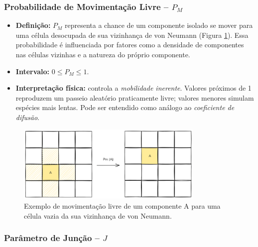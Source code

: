 \documentclass[12pt,oneside]{report}
\begin{document}
\subsubsection{Probabilidade de Movimentação Livre – \texorpdfstring{$P_M$}{Pm}}
\label{subsubsec:Pm}

\begin{itemize}
    \item \textbf{Definição:} $P_M$ representa a chance de um componente isolado se mover para uma célula desocupada de sua vizinhança de von Neumann (Figura \ref{fig:movimentacao_livre}). Essa probabilidade é influenciada por fatores como a densidade de componentes nas células vizinhas e a natureza do próprio componente.
    \item \textbf{Intervalo:} $0 \le P_M \le 1$.
    \item \textbf{Interpretação física:} controla a \textit{mobilidade inerente}.
          Valores próximos de 1 reproduzem um passeio aleatório praticamente livre; valores
          menores simulam espécies mais lentas. Pode ser entendido como análogo ao \textit{coeficiente de difusão}.
\end{itemize}

\begin{figure}[H]
    \centering
    \includegraphics[width=0.8\textwidth]{img/Pm.png}
    \caption{\small Exemplo de movimentação livre de um componente A para uma célula vazia da sua vizinhança de von Neumann.}
    \label{fig:movimentacao_livre}
\end{figure}

\subsubsection{Parâmetro de Junção – \texorpdfstring{$J$}{J}}
\label{subsubsec:J}
\end{document}
